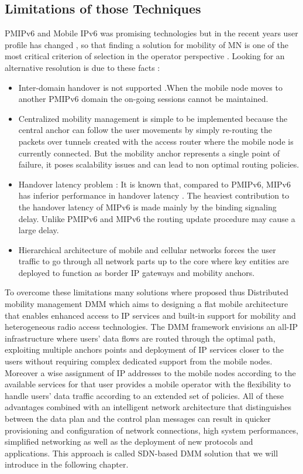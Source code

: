 \documentclass{article}
\begin{document}
\subsection{Limitations of those Techniques}

PMIPv6 and Mobile IPv6 was promising technologies but in the recent
years user profile has changed , so that finding a solution for
mobility of MN is one of the most critical criterion of selection in
the operator perspective . Looking for an alternative resolution is
due to these facts :
\begin{itemize}

  \item 
Inter-domain handover is not supported .When the mobile node moves to
another PMIPv6 domain the on-going sessions cannot be maintained.
  \item 
Centralized mobility management is simple to be implemented because
the central anchor can follow the user movements by simply re-routing
the packets over tunnels created with the access router where the
mobile node is currently connected.  But the mobility anchor
represents a single point of failure, it poses scalability issues and
can lead to non optimal routing policies.
  \item  
Handover latency problem : It is known that, compared to PMIPv6, MIPv6
has inferior performance in handover latency . The heaviest
contribution to the handover latency of MIPv6 is made mainly by the
binding signaling delay. Unlike PMIPv6 and MIPv6 the routing update
procedure may cause a large delay.
  \item  
Hierarchical architecture of mobile and cellular networks forces the
user traffic to go through all network parts up to the core where key
entities are deployed to function as border IP gateways and mobility
anchors.
\end{itemize}

To overcome these limitations many solutions where proposed thus
Distributed mobility management DMM which aims to designing a flat
mobile architecture that enables enhanced access to IP services and
built-in support for mobility and heterogeneous radio access
technologies. The DMM framework envisions an all-IP infrastructure
where users’ data flows are routed through the optimal path,
exploiting multiple anchors points and deployment of IP services
closer to the users without requiring complex dedicated support from
the mobile nodes. Moreover a wise assignment of IP addresses to the
mobile nodes according to the available services for that user
provides a mobile operator with the flexibility to handle users’ data
traffic according to an extended set of policies. All of these
advantages combined with an intelligent network architecture that
distinguishes between the data plan and the control plan messages can
result in quicker provisioning and configuration of network
connections, high system performances, simplified networking as well
as the deployment of new protocols and applications. This approach is
called SDN-based DMM solution that we will introduce in the following
chapter.
\end{document}
